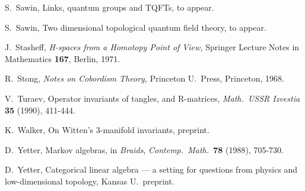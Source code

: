 \begin{thebibliography}{10}
 S.\ Sawin, Links, quantum groups and TQFTs, to
appear.

 S.\ Sawin, Two dimensional topological quantum field
theory, to appear.  

 J.\ Stasheff, {\sl H-spaces from a Homotopy
Point of View,} Springer Lecture Notes in Mathematics {\bf 167},
Berlin, 1971.

 R.\ Stong, {\sl Notes on Cobordism Theory,}
Princeton U.\ Press, Princeton, 1968.

 V.\ Turaev, Operator invariants of tangles, and
R-matrices, {\sl Math.\ USSR Izvestia} {\bf 35} (1990), 411-444.

 K.\ Walker, On Witten's 3-manifold invariants,
preprint.

 D.\ Yetter, Markov algebras, in {\sl Braids},
{\sl Contemp.\ Math.\ }{\bf 78} (1988), 705-730.

 D.\ Yetter, Categorical linear algebra --- a
setting for questions from physics and low-dimensional topology,
Kansas U.\ preprint.

\end{thebibliography}





